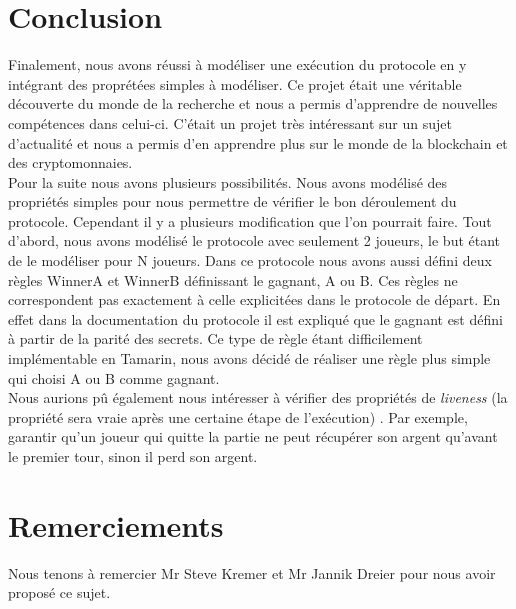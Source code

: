 \documentclass[conference]{IEEEtran}
\begin{document}
\section{Conclusion}
Finalement, nous avons réussi à modéliser une exécution du protocole en y intégrant des proprétées simples à modéliser. Ce projet était une véritable découverte du monde de la recherche et nous a permis d'apprendre de nouvelles compétences dans celui-ci. C'était un projet très intéressant sur un sujet d'actualité et nous a permis d'en apprendre plus sur le monde de la blockchain et des cryptomonnaies. \\

Pour la suite nous avons plusieurs possibilités. Nous avons modélisé des propriétés simples pour nous permettre de vérifier le bon déroulement du protocole. Cependant il y a plusieurs modification que l'on pourrait faire. Tout d'abord, nous avons modélisé le protocole avec seulement 2 joueurs, le but étant de le modéliser pour N joueurs. Dans ce protocole nous avons aussi défini deux règles WinnerA et WinnerB définissant le gagnant, A ou B. Ces règles ne correspondent pas exactement à celle explicitées dans le protocole de départ. En effet dans la documentation du protocole il est expliqué que le gagnant est défini à partir de la parité des secrets. Ce type de règle étant difficilement implémentable en Tamarin, nous avons décidé de réaliser une règle plus simple qui choisi A ou B comme gagnant. \\

Nous aurions pû également nous intéresser à vérifier des propriétés de \textit{liveness} (la propriété sera vraie après une certaine étape de l'exécution) \cite{vivacite}.
Par exemple, garantir qu'un joueur qui quitte la partie ne peut récupérer son argent qu'avant le premier tour, sinon il perd son argent.


\section{Remerciements}
Nous tenons à remercier Mr Steve Kremer et Mr Jannik Dreier pour nous avoir proposé ce sujet. 



\newpage


\end{document}
